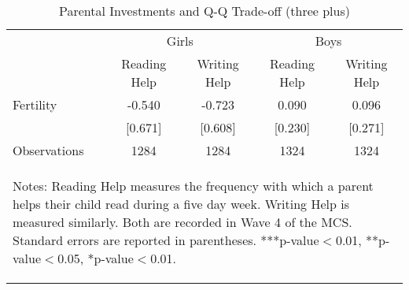 \begin{table}[htbp]\centering
\def\sym#1{\ifmmode^{#1}\else\(^{#1}\)\fi}
\caption{Parental Investments and Q-Q Trade-off (three plus)}
\begin{tabular}{l*{4}{c}}
\toprule
                    &\multicolumn{2}{c}{Girls}      &\multicolumn{2}{c}{Boys}       \\\cmidrule(lr){2-3}\cmidrule(lr){4-5}
                    &Reading Help   &Writing Help   &Reading Help   &Writing Help   \\
\midrule
Fertility           &      -0.540   &      -0.723   &       0.090   &       0.096   \\
                    &     [0.671]   &     [0.608]   &     [0.230]   &     [0.271]   \\
\midrule
Observations        &        1284   &        1284   &        1324   &        1324   \\
\bottomrule\multicolumn{5}{p{12.6cm}}{\begin{footnotesize}
Notes: Reading Help measures the frequency with which a   
parent helps their child read during a five day week.     
Writing Help is measured similarly. Both are recorded in  
Wave 4 of the MCS. Standard errors are reported in parentheses. ***p-value$<$0.01, **p-value$<$0.05, *p-value$<$0.01.                                
\end{footnotesize}}\end{tabular}\end{table}
